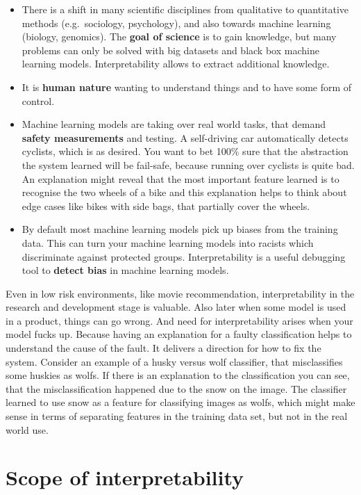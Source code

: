 \documentclass[12pt,]{krantz}
\providecommand{\tightlist}{%
  \setlength{\itemsep}{0pt}\setlength{\parskip}{0pt}}
\theoremstyle{definition}
\theoremstyle{definition}
\theoremstyle{definition}
\theoremstyle{remark}
\begin{document}
\begin{itemize}
\tightlist
\item
  There is a shift in many scientific disciplines from qualitative to
  quantitative methods (e.g.~sociology, psychology), and also towards
  machine learning (biology, genomics). The \textbf{goal of science} is
  to gain knowledge, but many problems can only be solved with big
  datasets and black box machine learning models. Interpretability
  allows to extract additional knowledge.
\item
  It is \textbf{human nature} wanting to understand things and to have
  some form of control.
\item
  Machine learning models are taking over real world tasks, that demand
  \textbf{safety measurements} and testing. A self-driving car
  automatically detects cyclists, which is as desired. You want to bet
  100\% sure that the abstraction the system learned will be fail-safe,
  because running over cyclists is quite bad. An explanation might
  reveal that the most important feature learned is to recognise the two
  wheels of a bike and this explanation helps to think about edge cases
  like bikes with side bags, that partially cover the wheels.
\item
  By default most machine learning models pick up biases from the
  training data. This can turn your machine learning models into racists
  which discriminate against protected groups. Interpretability is a
  useful debugging tool to \textbf{detect bias} in machine learning
  models.
\end{itemize}

Even in low risk environments, like movie recommendation,
interpretability in the research and development stage is valuable. Also
later when some model is used in a product, things can go wrong. And
need for interpretability arises when your model fucks up. Because
having an explanation for a faulty classification helps to understand
the cause of the fault. It delivers a direction for how to fix the
system. Consider an example of a husky versus wolf classifier, that
misclassifies some huskies as wolfs. If there is an explanation to the
classification you can see, that the misclassification happened due to
the snow on the image. The classifier learned to use snow as a feature
for classifying images as wolfs, which might make sense in terms of
separating features in the training data set, but not in the real world
use.

\section{Scope of interpretability}\label{scope-of-interpretability}
\end{document}
